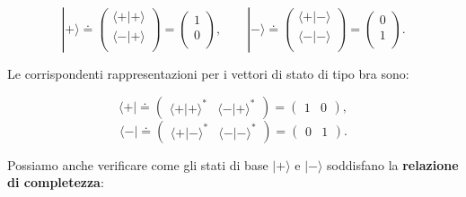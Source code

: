 \begin{equation}
| + \rangle \doteq
\begin{pmatrix}
\langle + | + \rangle \\
\langle - | + \rangle \\
\end{pmatrix} = 
\begin{pmatrix}
1 \\
0 \\
\end{pmatrix}, \qquad
| - \rangle \doteq
\begin{pmatrix}
\langle + | - \rangle \\
\langle - | - \rangle \\
\end{pmatrix} = 
\begin{pmatrix}
0 \\
1 \\
\end{pmatrix} .
\end{equation}

Le corrispondenti rappresentazioni per i vettori di stato di tipo bra sono:

\begin{equation}
\langle + | \doteq
\begin{pmatrix}
\langle + | + \rangle ^* & \langle - | + \rangle ^* 
\end{pmatrix} = 
\begin{pmatrix}
1 & 0
\end{pmatrix} ,
\end{equation}
\begin{equation}
\langle - |  \doteq
\begin{pmatrix}
\langle + | - \rangle ^* & \langle - | - \rangle ^* 
\end{pmatrix} = 
\begin{pmatrix}
0 & 1
\end{pmatrix} .
\end{equation}

Possiamo anche verificare come gli stati di base $| + \rangle $ e $| - \rangle$ soddisfano la \textbf{relazione di completezza}:

